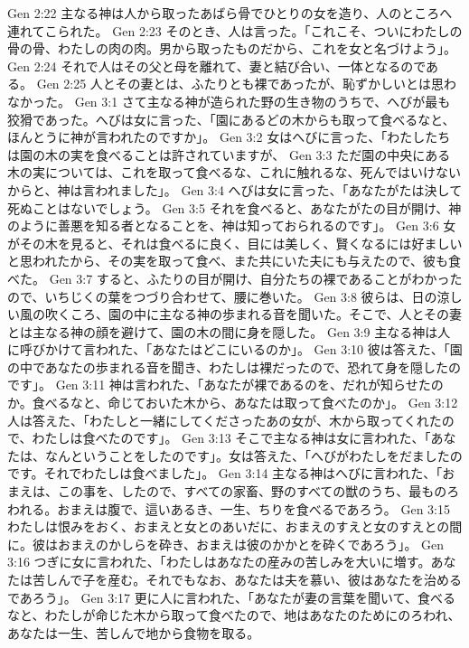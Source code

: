 Gen 2:22  主なる神は人から取ったあばら骨でひとりの女を造り、人のところへ連れてこられた。
Gen 2:23  そのとき、人は言った。「これこそ、ついにわたしの骨の骨、わたしの肉の肉。男から取ったものだから、これを女と名づけよう」。
Gen 2:24  それで人はその父と母を離れて、妻と結び合い、一体となるのである。
Gen 2:25  人とその妻とは、ふたりとも裸であったが、恥ずかしいとは思わなかった。
Gen 3:1  さて主なる神が造られた野の生き物のうちで、へびが最も狡猾であった。へびは女に言った、「園にあるどの木からも取って食べるなと、ほんとうに神が言われたのですか」。
Gen 3:2  女はへびに言った、「わたしたちは園の木の実を食べることは許されていますが、
Gen 3:3  ただ園の中央にある木の実については、これを取って食べるな、これに触れるな、死んではいけないからと、神は言われました」。
Gen 3:4  へびは女に言った、「あなたがたは決して死ぬことはないでしょう。
Gen 3:5  それを食べると、あなたがたの目が開け、神のように善悪を知る者となることを、神は知っておられるのです」。
Gen 3:6  女がその木を見ると、それは食べるに良く、目には美しく、賢くなるには好ましいと思われたから、その実を取って食べ、また共にいた夫にも与えたので、彼も食べた。
Gen 3:7  すると、ふたりの目が開け、自分たちの裸であることがわかったので、いちじくの葉をつづり合わせて、腰に巻いた。
Gen 3:8  彼らは、日の涼しい風の吹くころ、園の中に主なる神の歩まれる音を聞いた。そこで、人とその妻とは主なる神の顔を避けて、園の木の間に身を隠した。
Gen 3:9  主なる神は人に呼びかけて言われた、「あなたはどこにいるのか」。
Gen 3:10  彼は答えた、「園の中であなたの歩まれる音を聞き、わたしは裸だったので、恐れて身を隠したのです」。
Gen 3:11  神は言われた、「あなたが裸であるのを、だれが知らせたのか。食べるなと、命じておいた木から、あなたは取って食べたのか」。
Gen 3:12  人は答えた、「わたしと一緒にしてくださったあの女が、木から取ってくれたので、わたしは食べたのです」。
Gen 3:13  そこで主なる神は女に言われた、「あなたは、なんということをしたのです」。女は答えた、「へびがわたしをだましたのです。それでわたしは食べました」。
Gen 3:14  主なる神はへびに言われた、「おまえは、この事を、したので、すべての家畜、野のすべての獣のうち、最ものろわれる。おまえは腹で、這いあるき、一生、ちりを食べるであろう。
Gen 3:15  わたしは恨みをおく、おまえと女とのあいだに、おまえのすえと女のすえとの間に。彼はおまえのかしらを砕き、おまえは彼のかかとを砕くであろう」。
Gen 3:16  つぎに女に言われた、「わたしはあなたの産みの苦しみを大いに増す。あなたは苦しんで子を産む。それでもなお、あなたは夫を慕い、彼はあなたを治めるであろう」。
Gen 3:17  更に人に言われた、「あなたが妻の言葉を聞いて、食べるなと、わたしが命じた木から取って食べたので、地はあなたのためにのろわれ、あなたは一生、苦しんで地から食物を取る。
